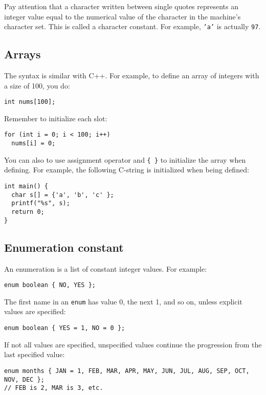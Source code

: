\documentclass[11pt]{article}
\begin{document}
Pay attention that a character written between single quotes represents an integer value equal to the numerical value of the character in the machine's character set. This is called a character constant. For example, \texttt{'a'} is actually \texttt{97}.
\subsection{Arrays}
\label{sec:org0df76ef}
The syntax is similar with C++. For example, to define an array of integers with a size of 100, you do:
\begin{verbatim}
int nums[100];
\end{verbatim}
Remember to initialize each slot:
\begin{verbatim}
for (int i = 0; i < 100; i++)
  nums[i] = 0;
\end{verbatim}

You can also to use assignment operator and \texttt{\{ \}} to initialize the array when defining. For example, the following C-string is initialized when being defined:
\begin{verbatim}
int main() {
  char s[] = {'a', 'b', 'c' };
  printf("%s", s);
  return 0;
}
\end{verbatim}
\subsection{Enumeration constant}
\label{sec:org7d994d0}
An enumeration is a list of constant integer values. For example:
\begin{verbatim}
enum boolean { NO, YES };
\end{verbatim}
The first name in an \texttt{enum} has value 0, the next 1, and so on, unless explicit values are specified:
\begin{verbatim}
enum boolean { YES = 1, NO = 0 };
\end{verbatim}

If not all values are specified, unspecified values continue the progression from the last specified value:
\begin{verbatim}
enum months { JAN = 1, FEB, MAR, APR, MAY, JUN, JUL, AUG, SEP, OCT, NOV, DEC };
// FEB is 2, MAR is 3, etc.
\end{verbatim}
\end{document}
